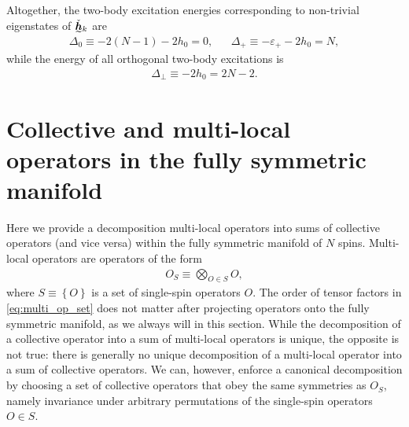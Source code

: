 \documentclass[nofootinbib,notitlepage,11pt]{revtex4-2}
\newcommand{\p}[1]{\left(#1\right)} %
\renewcommand{\set}[1]{\left\{#1\right\}} %
\newcommand{\m}{\bm} %
\newcommand{\1}{\mathds{1}}
\newcommand{\ut}{\undertilde}
\begin{document}
Altogether, the two-body excitation energies corresponding to
non-trivial eigenstates of $\ut{\check{\m h}}_k$ are
\begin{align}
  \Delta_0 \equiv -2\p{N-1} - 2 h_0 = 0,
  &&
  \Delta_+ \equiv -\varepsilon_+ - 2 h_0 = N,
\end{align}
while the energy of all orthogonal two-body excitations is
\begin{align}
  \Delta_\perp \equiv - 2 h_0 = 2N - 2.
\end{align}

\section{Collective and multi-local operators in the fully symmetric
  manifold}
\label{sec:multi_to_collective}

Here we provide a decomposition multi-local operators into sums of
collective operators (and vice versa) within the fully symmetric
manifold of $N$ spins.  Multi-local operators are operators of the
form
\begin{align}
  O_S \equiv \bigotimes_{O\in S} O,
  \label{eq:multi_op_set}
\end{align}
where $S\equiv\set{O}$ is a set of single-spin operators $O$.  The
order of tensor factors in \eqref{eq:multi_op_set} does not matter
after projecting operators onto the fully symmetric manifold, as we
always will in this section.  While the decomposition of a collective
operator into a sum of multi-local operators is unique, the opposite
is not true: there is generally no unique decomposition of a
multi-local operator into a sum of collective operators.  We can,
however, enforce a canonical decomposition by choosing a set of
collective operators that obey the same symmetries as $O_S$, namely
invariance under arbitrary permutations of the single-spin operators
$O\in S$.
\end{document}
